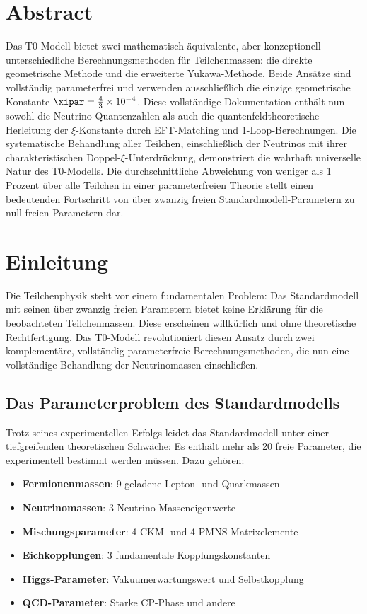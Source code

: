 

\section*{Abstract}
Das T0-Modell bietet zwei mathematisch äquivalente, aber konzeptionell unterschiedliche Berechnungsmethoden für Teilchenmassen: die direkte geometrische Methode und die erweiterte Yukawa-Methode. Beide Ansätze sind vollständig parameterfrei und verwenden ausschließlich die einzige geometrische Konstante $\xipar = \frac{4}{3} \times 10^{-4}$. Diese vollständige Dokumentation enthält nun sowohl die Neutrino-Quantenzahlen als auch die quantenfeldtheoretische Herleitung der $\xi$-Konstante durch EFT-Matching und 1-Loop-Berechnungen. Die systematische Behandlung aller Teilchen, einschließlich der Neutrinos mit ihrer charakteristischen Doppel-$\xi$-Unterdrückung, demonstriert die wahrhaft universelle Natur des T0-Modells. Die durchschnittliche Abweichung von weniger als 1 Prozent über alle Teilchen in einer parameterfreien Theorie stellt einen bedeutenden Fortschritt von über zwanzig freien Standardmodell-Parametern zu null freien Parametern dar.


\section{Einleitung}
\label{sec:introduction}

Die Teilchenphysik steht vor einem fundamentalen Problem: Das Standardmodell mit seinen über zwanzig freien Parametern bietet keine Erklärung für die beobachteten Teilchenmassen. Diese erscheinen willkürlich und ohne theoretische Rechtfertigung. Das T0-Modell revolutioniert diesen Ansatz durch zwei komplementäre, vollständig parameterfreie Berechnungsmethoden, die nun eine vollständige Behandlung der Neutrinomassen einschließen.

\subsection{Das Parameterproblem des Standardmodells}
\label{subsec:parameter_problem}

Trotz seines experimentellen Erfolgs leidet das Standardmodell unter einer tiefgreifenden theoretischen Schwäche: Es enthält mehr als 20 freie Parameter, die experimentell bestimmt werden müssen. Dazu gehören:

\begin{itemize}
	\item \textbf{Fermionenmassen}: 9 geladene Lepton- und Quarkmassen
	\item \textbf{Neutrinomassen}: 3 Neutrino-Masseneigenwerte
	\item \textbf{Mischungsparameter}: 4 CKM- und 4 PMNS-Matrixelemente
	\item \textbf{Eichkopplungen}: 3 fundamentale Kopplungskonstanten
	\item \textbf{Higgs-Parameter}: Vakuumerwartungswert und Selbstkopplung
	\item \textbf{QCD-Parameter}: Starke CP-Phase und andere
\end{itemize}

